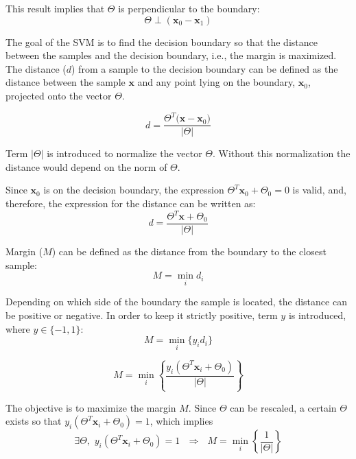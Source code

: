 \documentclass{article}
\begin{document}
\noindent This result implies that $\Theta$ is perpendicular to the boundary:
\begin{equation} 
\Theta \perp \left(\mathbf{x}_0 - \mathbf{x}_1\right)
\end{equation}


The goal of the SVM is to find the decision boundary so that the distance between the samples and the decision boundary, i.e., the margin is maximized. The distance ($d$) from a sample to the decision boundary can be defined as the distance between the sample $\mathbf{x}$ and any point lying on the boundary, $\mathbf{x}_0$, projected onto the vector $\Theta$.

\begin{equation} 
d = \frac{\Theta^T \big(\mathbf{x} - \mathbf{x}_0\big)}{\big\vert \Theta \big\vert}
\end{equation}

\noindent Term $\vert \Theta \vert$ is introduced to normalize the vector $\Theta$. Without this normalization the distance would depend on the norm of $\Theta$.

Since $\mathbf{x}_0$ is on the decision boundary, the expression $\Theta^T \mathbf{x}_0 + \Theta_0 = 0$ is valid, and, therefore, the expression for the distance can be written as:
\begin{equation} 
d = \frac{\Theta^T \mathbf{x} + \Theta_0}{\big\vert \Theta \big\vert}
\end{equation}

Margin ($M$) can be defined as the distance from the boundary to the closest sample:
\begin{equation} 
M = \min_i d_i
\end{equation}

Depending on which side of the boundary the sample is located, the distance can be positive or negative. In order to keep it strictly positive, term $y$ is introduced, where $y \in \{-1,1\}$:
\begin{equation} 
M = \min_i \big\{y_id_i\big\}
\end{equation}

\begin{equation} 
M = \min_i \left\{ \frac{y_i \left(\Theta^T \mathbf{x}_i + \Theta_0\right)}{\left\vert \Theta \right\vert} \right\}
\end{equation}

The objective is to maximize the margin $M$. Since $\Theta$ can be rescaled, a certain $\Theta$ exists so that $y_i \left(\Theta^T \mathbf{x}_i + \Theta_0\right) = 1$, which implies
\begin{equation} 
\exists \Theta, \,\, y_i \left(\Theta^T \mathbf{x}_i + \Theta_0\right) = 1 \,\,\,\, \Rightarrow \,\,\,\, M = \min_i \left\{ \frac{1}{\left\vert \Theta \right\vert} \right\}
\end{equation}
\end{document}
